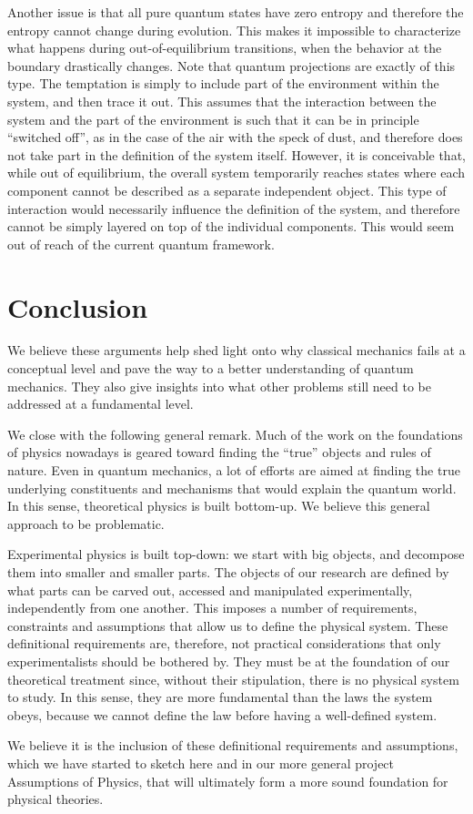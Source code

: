 \documentclass[10pt,twocolumn, nofootinbib]{revtex4-2}
\begin{document}
Another issue is that all pure quantum states have zero entropy and therefore the entropy cannot change during evolution. This makes it impossible to characterize what happens during out-of-equilibrium transitions, when the behavior at the boundary drastically changes. Note that quantum projections are exactly of this type. The temptation is simply to include part of the environment within the system, and then trace it out. This assumes that the interaction between the system and the part of the environment is such that it can be in principle ``switched off'', as in the case of the air with the speck of dust, and therefore does not take part in the definition of the system itself. However, it is conceivable that, while out of equilibrium, the overall system temporarily reaches states where each component cannot be described as a separate independent object. This type of interaction would necessarily influence the definition of the system, and therefore cannot be simply layered on top of the individual components. This would seem out of reach of the current quantum framework.

\section{Conclusion}

We believe these arguments help shed light onto why classical mechanics fails at a conceptual level and pave the way to a better understanding of quantum mechanics. They also give insights into what other problems still need to be addressed at a fundamental level.

We close with the following general remark. Much of the work on the foundations of physics nowadays is geared toward finding the ``true'' objects and rules of nature. Even in quantum mechanics, a lot of efforts are aimed at finding the true underlying constituents and mechanisms that would explain the quantum world. In this sense, theoretical physics is built bottom-up. We believe this general approach to be problematic.

Experimental physics is built top-down: we start with big objects, and decompose them into smaller and smaller parts. The objects of our research are defined by what parts can be carved out, accessed and manipulated experimentally, independently from one another. This imposes a number of requirements, constraints and assumptions that allow us to define the physical system. These definitional requirements are, therefore, not practical considerations that only experimentalists should be bothered by. They must be at the foundation of our theoretical treatment since, without their stipulation, there is no physical system to study. In this sense, they are more fundamental than the laws the system obeys, because we cannot define the law before having a well-defined system.

We believe it is the inclusion of these definitional requirements and assumptions, which we have started to sketch here and in our more general project Assumptions of Physics, that will ultimately form a more sound foundation for physical theories.




\end{document}
